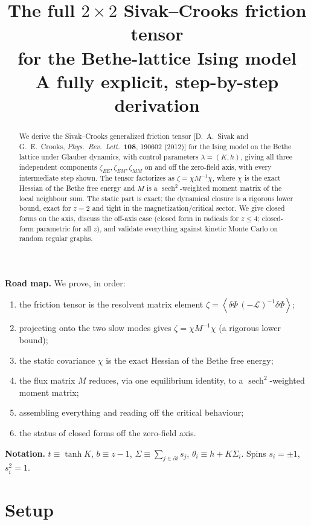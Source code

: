 \documentclass[11pt]{article}
\title{\bf The full $2\times2$ Sivak--Crooks friction tensor\\ for the Bethe-lattice Ising model\\[4pt]
\large A fully explicit, step-by-step derivation}
\author{}
\date{}
\newcommand{\sech}{\operatorname{sech}}
\newcommand{\LL}{\mathcal{L}}
\newcommand{\avg}[1]{\left\langle #1 \right\rangle}
\newcommand{\dPhi}{\delta\Phi}
\newcommand{\Sig}{\Sigma}
\begin{document}
\maketitle
\vspace{-3.5em}

\begin{abstract}
\noindent
We derive the Sivak--Crooks generalized friction tensor [D.~A.~Sivak and G.~E.~Crooks,
\emph{Phys.\ Rev.\ Lett.}\ \textbf{108}, 190602 (2012)] for the Ising model on the Bethe lattice
under Glauber dynamics, with control parameters $\lambda=(K,h)$, giving all three independent
components $\zeta_{EE},\zeta_{EM},\zeta_{MM}$ on and off the zero-field axis, with every intermediate
step shown. The tensor factorizes as $\zeta=\chi M^{-1}\chi$, where $\chi$ is the exact Hessian of
the Bethe free energy and $M$ is a $\sech^2$-weighted moment matrix of the local neighbour sum. The
static part is exact; the dynamical closure is a rigorous lower bound, exact for $z=2$ and tight in
the magnetization/critical sector. We give closed forms on the axis, discuss the off-axis case
(closed form in radicals for $z\le4$; closed-form parametric for all $z$), and validate everything
against kinetic Monte Carlo on random regular graphs.
\end{abstract}

\noindent\textbf{Road map.} We prove, in order:
\begin{enumerate}[topsep=2pt,itemsep=1pt]
  \item the friction tensor is the resolvent matrix element $\zeta=\avg{\dPhi\,(-\LL)^{-1}\dPhi}$;
  \item projecting onto the two slow modes gives $\zeta=\chi M^{-1}\chi$ (a rigorous lower bound);
  \item the static covariance $\chi$ is the exact Hessian of the Bethe free energy;
  \item the flux matrix $M$ reduces, via one equilibrium identity, to a $\sech^2$-weighted moment matrix;
  \item assembling everything and reading off the critical behaviour;
  \item the status of closed forms off the zero-field axis.
\end{enumerate}

\noindent\textbf{Notation.} $t\equiv\tanh K$, $b\equiv z-1$, $\Sig\equiv\sum_{j\in\partial i}s_j$,
$\theta_i\equiv h+K\Sig_i$. Spins $s_i=\pm1$, $s_i^2=1$.

\section{Setup}
\end{document}
